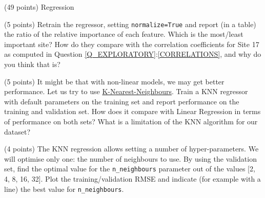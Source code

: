\documentclass[12pt]{article}
\begin{document}
\begin{question}{\label{Q_LR_BA}(49 points) Regression}
\begin{subquestion}



\end{subquestion}

\begin{subquestion}{(5 points) Retrain the regressor, setting \texttt{normalize=True} and report (in a table) the ratio of the relative importance of each feature. Which is the most/least important site? How do they compare with the correlation coefficients for Site 17 as computed in Question \ref{Q_EXPLORATORY}:\ref{CORRELATIONS}, and why do you think that is?}






\end{subquestion}

\begin{subquestion}{(5 points) It might be that with non-linear models, we may get better performance. Let us try to use \href{https://scikit-learn.org/stable/modules/generated/sklearn.neighbors.KNeighborsRegressor.html}{K-Nearest-Neighbours}. Train a KNN regressor with default parameters on the training set and report performance on the training and validation set.  How does it compare with Linear Regression in terms of performance on both sets? What is a limitation of the KNN algorithm for our dataset?}






\end{subquestion}

\begin{subquestion}{(4 points) The KNN regression allows setting a number of hyper-parameters. We will optimise only one: the number of neighbours to use. By using the validation set, find the optimal value for the \texttt{n\_neighbours} parameter out of the values [2, 4, 8, 16, 32]. Plot the training/validation RMSE and indicate (for example with a line) the best value for \texttt{n\_neighbours}.}






\end{subquestion}


\end{question}
\end{document}
